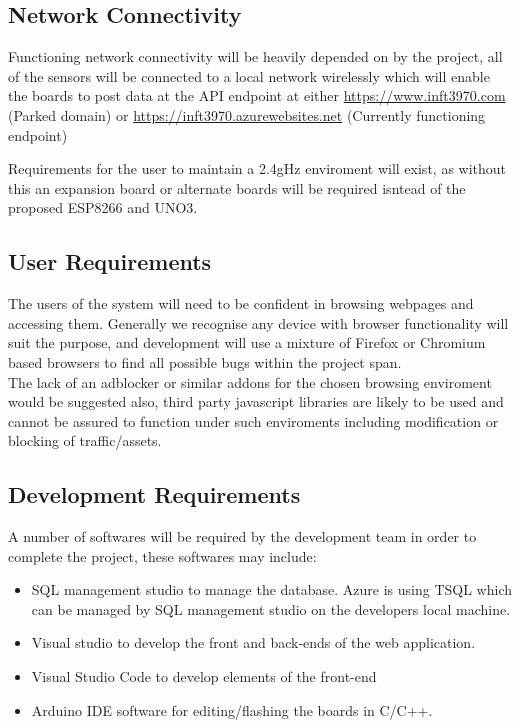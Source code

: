 \documentclass{article}
\newcounter{num}
\begin{document}
        \subsection{Network Connectivity}
            Functioning network connectivity will be heavily depended on by the project,
            all of the sensors will be connected to a local network wirelessly which will enable the boards
            to post data at the API endpoint at either \url{https://www.inft3970.com} (Parked domain) or 
            \url{https://inft3970.azurewebsites.net} (Currently functioning endpoint)
            \par
            Requirements for the user to maintain a 2.4gHz enviroment will exist, as without this an expansion board
            or alternate boards will be required isntead of the proposed ESP8266\cite{ESP8266} and UNO3\cite{UNO3}.
        
        \subsection{User Requirements}
            The users of the system will need to be confident in browsing webpages and accessing them. Generally
            we recognise any device with browser functionality will suit the purpose, and development will use a 
            mixture of Firefox\cite{Firefox} or Chromium\cite{Chromium} based browsers to find all possible bugs 
            within the project span.
            \\
            The lack of an adblocker or similar addons for the chosen browsing enviroment would be suggested also,
            third party javascript libraries are likely to be used and cannot be assured to function under such 
            enviroments including modification or blocking of traffic/assets.
        
        \subsection{Development Requirements\cite{DevelopmentResources}}
            A number of softwares will be required by the development team in order to complete the project,
            these softwares may include:
            \begin{itemize}
                \item SQL management studio to manage the database. Azure is using TSQL which can be managed by SQL management studio 
                on the developers local machine.
                \item Visual studio to develop the front and back-ends of the web application. 
                \item Visual Studio Code to develop elements of the front-end
                \item Arduino IDE software for editing/flashing the boards in C/C++.
            \end{itemize}
\end{document}
